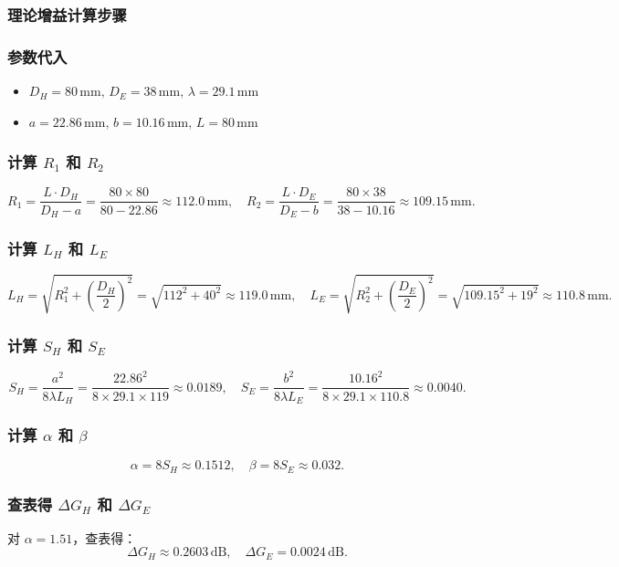 \documentclass[12pt,a4paper,UTF8]{article}
\begin{document}
\subsubsection{理论增益计算步骤}

\subsubsection*{参数代入}
\begin{itemize}
    \item \( D_H = 80 \, \text{mm}, \, D_E = 38 \, \text{mm}, \, \lambda = 29.1 \, \text{mm} \)
    \item \( a = 22.86 \, \text{mm}, \, b = 10.16 \, \text{mm}, \, L = 80 \, \text{mm} \)
\end{itemize}

\subsubsection*{计算 \( R_1 \) 和 \( R_2 \)}
\[
R_1 = \frac{L \cdot D_H}{D_H - a} = \frac{80 \times 80}{80 - 22.86} \approx 112.0 \, \text{mm}, \quad
R_2 = \frac{L \cdot D_E}{D_E - b} = \frac{80 \times 38}{38 - 10.16} \approx 109.15 \, \text{mm}.
\]

\subsubsection*{计算 \( L_H \) 和 \( L_E \)}
\[
L_H = \sqrt{R_1^2 + \left(\frac{D_H}{2}\right)^2} = \sqrt{112^2 + 40^2} \approx 119.0 \, \text{mm}, \quad
L_E = \sqrt{R_2^2 + \left(\frac{D_E}{2}\right)^2} = \sqrt{109.15^2 + 19^2} \approx 110.8 \, \text{mm}.
\]

\subsubsection*{计算 \( S_H \) 和 \( S_E \)}
\[
S_H = \frac{a^2}{8 \lambda L_H} = \frac{22.86^2}{8 \times 29.1 \times 119} \approx 0.0189, \quad
S_E = \frac{b^2}{8 \lambda L_E} = \frac{10.16^2}{8 \times 29.1 \times 110.8} \approx 0.0040.
\]

\subsubsection*{计算 \( \alpha \) 和 \( \beta \)}
\[
\alpha = 8S_H \approx 0.1512, \quad \beta = 8S_E \approx 0.032.
\]

\subsubsection*{查表得 \( \Delta G_H \) 和 \( \Delta G_E \)}
    对 \( \alpha = 1.51 \)，查表得：
    \[
    \Delta G_H \approx 0.2603 \, \text{dB}, \quad \Delta G_E = 0.0024 \, \text{dB}.
    \]
\end{document}
